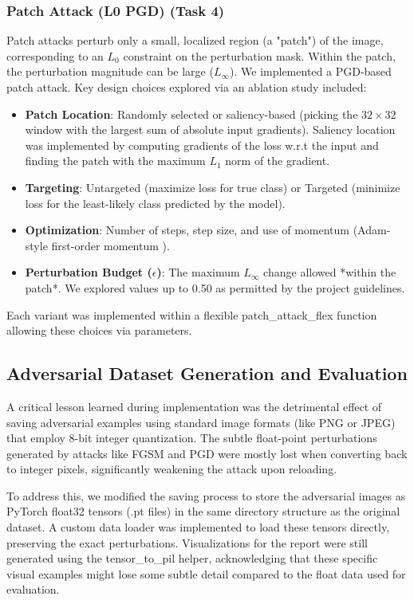 \documentclass[letterpaper]{article}
\begin{document}
\subsubsection{Patch Attack (L0 PGD) (Task 4)}
Patch attacks perturb only a small, localized region (a "patch") of the image, corresponding to an $L_0$ constraint on the perturbation mask. Within the patch, the perturbation magnitude can be large ($L_\infty$). We implemented a PGD-based patch attack. Key design choices explored via an ablation study included:
\begin{itemize}
    \item \textbf{Patch Location}: Randomly selected or saliency-based (picking the $32 \times 32$ window with the largest sum of absolute input gradients). Saliency location was implemented by computing gradients of the loss w.r.t the input and finding the patch with the maximum $L_1$ norm of the gradient.
    \item \textbf{Targeting}: Untargeted (maximize loss for true class) or Targeted (minimize loss for the least-likely class predicted by the model).
    \item \textbf{Optimization}: Number of steps, step size, and use of momentum (Adam-style first-order momentum \cite{dong2018boosting}).
    \item \textbf{Perturbation Budget ($\epsilon$)}: The maximum $L_\infty$ change allowed *within the patch*. We explored values up to 0.50 as permitted by the project guidelines.
\end{itemize}
Each variant was implemented within a flexible patch\_attack\_flex function allowing these choices via parameters.

\subsection{Adversarial Dataset Generation and Evaluation}
A critical lesson learned during implementation was the detrimental effect of saving adversarial examples using standard image formats (like PNG or JPEG) that employ 8-bit integer quantization. The subtle float-point perturbations generated by attacks like FGSM and PGD were mostly lost when converting back to integer pixels, significantly weakening the attack upon reloading.

To address this, we modified the saving process to store the adversarial images as PyTorch float32 tensors (.pt files) in the same directory structure as the original dataset. A custom data loader was implemented to load these tensors directly, preserving the exact perturbations. Visualizations for the report were still generated using the tensor\_to\_pil helper, acknowledging that these specific visual examples might lose some subtle detail compared to the float data used for evaluation.
\end{document}
